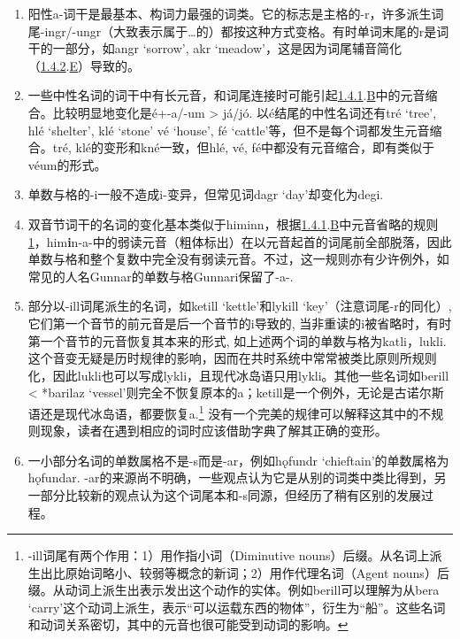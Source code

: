\begin{enumerate}
\def\labelenumi{\arabic{enumi})}
\item
  阳性a-词干是最基本、构词力最强的词类。它的标志是主格的-r，许多派生词尾-ingr/-ungr（大致表示属于\ldots 的）都按这种方式变格。有时单词末尾的r是词干的一部分，如angr
  `sorrow', akr
  `meadow'，这是因为词尾辅音简化（\hyperref[ux8f85ux97f3ux7684ux97f3ux53d8]{1.4.2}.\hyperref[_Ref115765758]{E}）导致的。
\item
  一些中性名词的词干中有长元音，和词尾连接时可能引起\hyperref[ux5143ux97f3ux7684ux97f3ux53d8]{1.4.1}.\hyperref[_Ref115693879]{B}中的元音缩合。比较明显地变化是é+-a/-um
  \textgreater{} já/jó. 以é结尾的中性名词还有tré `tree', hlé `shelter',
  klé `stone' vé `house', fé
  `cattle'等，但不是每个词都发生元音缩合。tré,
  klé的变形和kné一致，但hlé, vé,
  fé中都没有元音缩合，即有类似于véum的形式。
\item
  单数与格的-i一般不造成i-变异，但常见词dagr `day'却变化为degi.
\item
  双音节词干的名词的变化基本类似于himinn，根据\hyperref[ux5143ux97f3ux7684ux97f3ux53d8]{1.4.1}.\hyperref[_Ref115693879]{B}中元音省略的规则\hyperref[_Ref115694569]{1}，him\textbf{i}n-a-中的弱读元音（粗体标出）在以元音起首的词尾前全部脱落，因此单数与格和整个复数中完全没有弱读元音。不过，这一规则亦有少许例外，如常见的人名Gunnar的单数与格Gunnari保留了-a-.
\item
  部分以-ill词尾派生的名词，如ketill `kettle'和lykill
  `key'（注意词尾-r的同化）,
  它们第一个音节的前元音是后一个音节的i导致的,
  当非重读的i被省略时，有时第一个音节的元音恢复其本来的形式,
  如上述两个词的单数与格为katli，lukli.
  这个音变无疑是历时规律的影响，因而在共时系统中常常被类比原则所规则化，因此lukli也可以写成lykli，且现代冰岛语只用lykli。其他一些名词如berill
  \textless{} *barilaz
  `vessel'则完全不恢复原本的a；ketill是一个例外，无论是古诺尔斯语还是现代冰岛语，都要恢复a.\footnote{-ill词尾有两个作用：1）用作指小词（Diminutive
    nouns）后缀。从名词上派生出比原始词略小、较弱等概念的新词；2）用作代理名词（Agent
    nouns）后缀。从动词上派生出表示发出这个动作的实体。例如berill可以理解为从bera
    `carry'这个动词上派生，表示``可以运载东西的物体''，衍生为``船''。这些名词和动词关系密切，其中的元音也很可能受到动词的影响。}
  没有一个完美的规律可以解释这其中的不规则现象，读者在遇到相应的词时应该借助字典了解其正确的变形。
\item
  一小部分名词的单数属格不是-s而是-ar，例如hǫfundr
  `chieftain'的单数属格为hǫfundar.
  -ar的来源尚不明确，一些观点认为它是从别的词类中类比得到，另一部分比较新的观点认为这个词尾本和-s同源，但经历了稍有区别的发展过程。
\end{enumerate}

